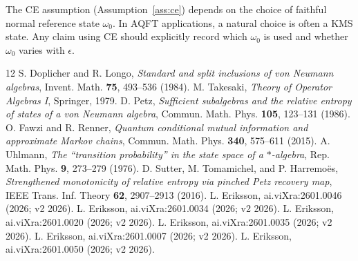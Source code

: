 \documentclass[11pt]{article}
\theoremstyle{definition}
\theoremstyle{remark}
\begin{document}
The CE assumption (Assumption~\ref{ass:ce}) depends on the choice of
faithful normal reference state $\omega_0$. In AQFT applications, a
natural choice is often a KMS state. Any claim using CE should
explicitly record which $\omega_0$ is used and whether $\omega_0$ varies
with $\epsilon$.

\begin{thebibliography}{12}
 S. Doplicher and R. Longo, \emph{Standard and split
inclusions of von Neumann algebras}, Invent. Math. \textbf{75}, 493--536
(1984).
 M. Takesaki, \emph{Theory of Operator Algebras I},
Springer, 1979.
 D. Petz, \emph{Sufficient subalgebras and the relative
entropy of states of a von Neumann algebra}, Commun. Math. Phys.
\textbf{105}, 123--131 (1986).
 O. Fawzi and R. Renner, \emph{Quantum conditional mutual
information and approximate Markov chains}, Commun. Math. Phys.
\textbf{340}, 575--611 (2015).
 A. Uhlmann, \emph{The ``transition probability'' in
the state space of a $*$-algebra}, Rep. Math. Phys. \textbf{9}, 273--279
(1976).
 D. Sutter, M. Tomamichel, and P. Harremo\"es,
\emph{Strengthened monotonicity of relative entropy via pinched Petz
recovery map}, IEEE Trans. Inf. Theory \textbf{62}, 2907--2913 (2016).
 L. Eriksson, ai.viXra:2601.0046 (2026; v2 2026).
 L. Eriksson, ai.viXra:2601.0034 (2026; v2 2026).
 L. Eriksson, ai.viXra:2601.0020 (2026; v2 2026).
 L. Eriksson, ai.viXra:2601.0035 (2026; v2 2026).
 L. Eriksson, ai.viXra:2601.0007 (2026; v2 2026).
 L. Eriksson, ai.viXra:2601.0050 (2026; v2 2026).
\end{thebibliography}
\end{document}
